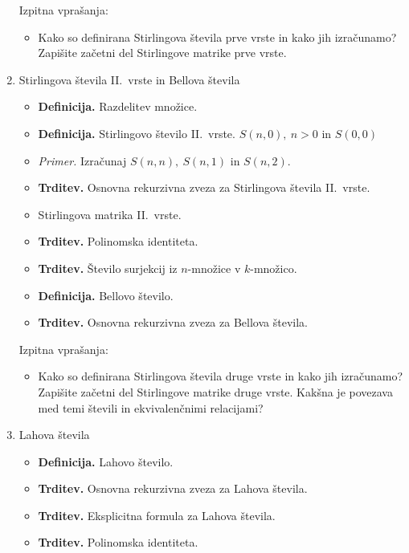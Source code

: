 \begin{enumerate}
    Izpitna vprašanja:
    \begin{itemize}
        \item Kako so definirana Stirlingova števila prve vrste in kako jih izračunamo? Zapišite začetni del Stirlingove matrike prve vrste.
    \end{itemize}

    \item Stirlingova števila II.\ vrste in Bellova števila
    \begin{itemize}
        \item \colorbox{purple!30}{\textbf{Definicija.}} Razdelitev množice.
        \item \colorbox{purple!30}{\textbf{Definicija.}} Stirlingovo število II.\ vrste. \(S(n,0), \ n > 0\) in \(S(0,0)\)
        \item \colorbox{yellow!30}{\emph{Primer.}} Izračunaj \(S(n,n), \ S(n, 1)\) in \(S(n, 2)\). 
        \item \colorbox{blue!30}{\textbf{Trditev.}} Osnovna rekurzivna zveza za Stirlingova števila II.\ vrste.
        \item Stirlingova matrika II.\ vrste.
        \item \colorbox{blue!30}{\textbf{Trditev.}} Polinomska identiteta.
        \item \colorbox{blue!30}{\textbf{Trditev.}} Število surjekcij iz \(n\)-množice v \(k\)-množico.
        \item \colorbox{purple!30}{\textbf{Definicija.}} Bellovo število.
        \item \colorbox{blue!30}{\textbf{Trditev.}} Osnovna rekurzivna zveza za Bellova števila.
    \end{itemize}

    Izpitna vprašanja:
    \begin{itemize}
        \item Kako so definirana Stirlingova števila druge vrste in kako jih izračunamo? Zapišite začetni del Stirlingove matrike druge vrste. Kakšna je povezava med temi števili in ekvivalenčnimi relacijami?
    \end{itemize}

    \item Lahova števila
    \begin{itemize}
        \item \colorbox{purple!30}{\textbf{Definicija.}} Lahovo število.
        \item \colorbox{blue!30}{\textbf{Trditev.}} Osnovna rekurzivna zveza za Lahova števila.
        \item \colorbox{blue!30}{\textbf{Trditev.}} Eksplicitna formula za Lahova števila.
        \item \colorbox{blue!30}{\textbf{Trditev.}} Polinomska identiteta.
    \end{itemize}


\end{enumerate}
